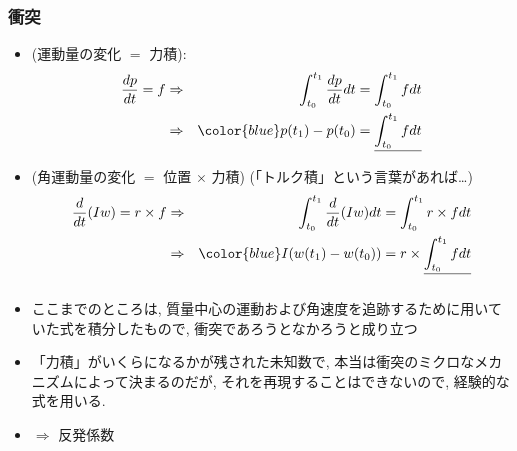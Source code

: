 \documentclass[10pt,dvipdfmx]{beamer}
\newcommand{\ao}[1]{{\color{blue}#1}}
\begin{document}
\begin{frame}[fragile]
\frametitle{衝突}

\begin{itemize}
\item \ao{(運動量の変化 $=$ 力積)}:
\begin{eqnarray}
\frac{dp}{dt} = f 
& \Rightarrow & \int_{t_0}^{t_1} \frac{dp}{dt}dt = \int_{t_0}^{t_1} f dt \\
& \Rightarrow & \ao{p(t_1) - p(t_0) = \underline{\int_{t_0}^{t_1} f dt}}
\label{eq:a}
\end{eqnarray}

\item \ao{(角運動量の変化 $=$ 位置 $\times$ 力積)} {\scriptsize (「トルク積」という言葉があれば\ldots)}
\begin{eqnarray}
\frac{d}{dt}(Iw) = r \times f 
& \Rightarrow & \int_{t_0}^{t_1} \frac{d}{dt}(Iw)dt = \int_{t_0}^{t_1} r \times f dt \\
& \Rightarrow & 
\ao{I (w(t_1) - w(t_0)) = r \times \underline{\int_{t_0}^{t_1} f dt}}
\label{eq:b}
\end{eqnarray}

\end{itemize}
\end{frame}

\begin{frame}[fragile]
\frametitle{}
\begin{itemize}
\item ここまでのところは, 
質量中心の運動および角速度を追跡するために用いていた式を積分したもので,
衝突であろうとなかろうと成り立つ

\item 「力積」がいくらになるかが残された未知数で, 
本当は衝突のミクロなメカニズムによって決まるのだが, 
それを再現することはできないので, 経験的な式を用いる.

\item $\Rightarrow$ 反発係数
\end{itemize}
\end{frame}
\end{document}
